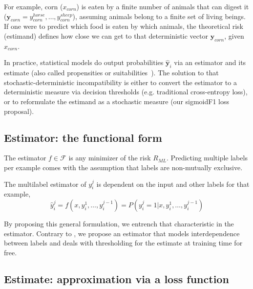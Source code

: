 For example, corn ($x_{corn}$) is eaten by a finite number of animals that can digest it ($\mathbf{y}_{corn} = {y_{corn}^{horse}, \ldots, y_{corn}^{sheep}} $), assuming animals belong to a finite set of living beings. If one were to predict which food is eaten by which animals, the theoretical risk (estimand) defines how close we can get to that deterministic vector $\mathbf{y}_{corn}$, given $x_{corn}$.
\fi

In practice, statistical models do output probabilities $\mathbf{\hat{y}}_{i}$ via an estimator and its estimate (also called propensities or suitabilities~\citep{multilabelReduction}). The solution to that stochastic-deterministic incompatibility is either to convert the estimator to a deterministic measure via decision thresholds (e.g. traditional cross-entropy loss), or to reformulate the estimand as a stochastic measure (our sigmoidF1 loss proposal). 

\subsection{Estimator: the functional form}
\label{section:background:estimator}

The estimator $f \in \mathcal{F}$ is any minimizer of the risk $R_{ML}$. Predicting multiple labels per example comes with the assumption that labels are non-mutually exclusive.

\vspace{-.5\baselineskip}
\begin{proposition}
  The multilabel estimator of $y_{i}^{j}$ is dependent on the input and other labels for that example,
%
\begin{equation}
  \hat{y}_i^j = f(x, y_{i}^{1}, \ldots, y_{i}^{j-1}) = P(y_i^j = 1 | x, y_{i}^{1}, \ldots, y_{i}^{j-1})
\end{equation}
\label{eq:estimator}
\end{proposition}
\vspace{-1.5\baselineskip}
%
 By proposing this general formulation, we entrench that characteristic in the estimator. Contrary to \citet{multilabelReduction}, we propose an estimator that models interdependence between labels and deals with thresholding for the estimate at training time for free.


\subsection{Estimate: approximation via a loss function}
\label{section:background:estimate}


